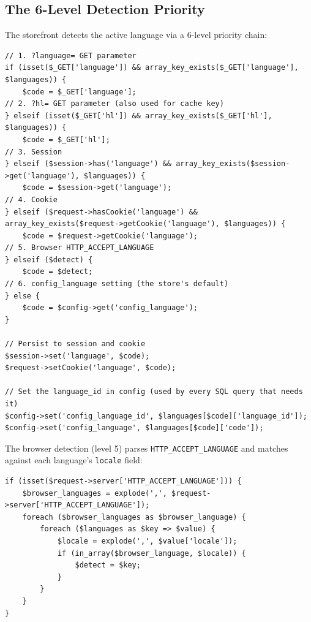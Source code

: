 \documentclass[11pt,a4paper]{article}
\begin{document}
\subsection{The 6-Level Detection Priority}

The storefront detects the active language via a 6-level priority chain:

\begin{lstlisting}[caption={Language detection in \texttt{app/shop/map.php} (abridged).},label={lst:language-detection}]
// 1. ?language= GET parameter
if (isset($_GET['language']) && array_key_exists($_GET['language'], $languages)) {
    $code = $_GET['language'];
// 2. ?hl= GET parameter (also used for cache key)
} elseif (isset($_GET['hl']) && array_key_exists($_GET['hl'], $languages)) {
    $code = $_GET['hl'];
// 3. Session
} elseif ($session->has('language') && array_key_exists($session->get('language'), $languages)) {
    $code = $session->get('language');
// 4. Cookie
} elseif ($request->hasCookie('language') && array_key_exists($request->getCookie('language'), $languages)) {
    $code = $request->getCookie('language');
// 5. Browser HTTP_ACCEPT_LANGUAGE
} elseif ($detect) {
    $code = $detect;
// 6. config_language setting (the store's default)
} else {
    $code = $config->get('config_language');
}

// Persist to session and cookie
$session->set('language', $code);
$request->setCookie('language', $code);

// Set the language_id in config (used by every SQL query that needs it)
$config->set('config_language_id', $languages[$code]['language_id']);
$config->set('config_language', $languages[$code]['code']);
\end{lstlisting}

The browser detection (level 5) parses \texttt{HTTP\_ACCEPT\_LANGUAGE}
and matches against each language's \texttt{locale} field:

\begin{lstlisting}[caption={Browser language detection.},label={lst:browser-lang}]
if (isset($request->server['HTTP_ACCEPT_LANGUAGE'])) {
    $browser_languages = explode(',', $request->server['HTTP_ACCEPT_LANGUAGE']);
    foreach ($browser_languages as $browser_language) {
        foreach ($languages as $key => $value) {
            $locale = explode(',', $value['locale']);
            if (in_array($browser_language, $locale)) {
                $detect = $key;
            }
        }
    }
}
\end{lstlisting}
\end{document}
